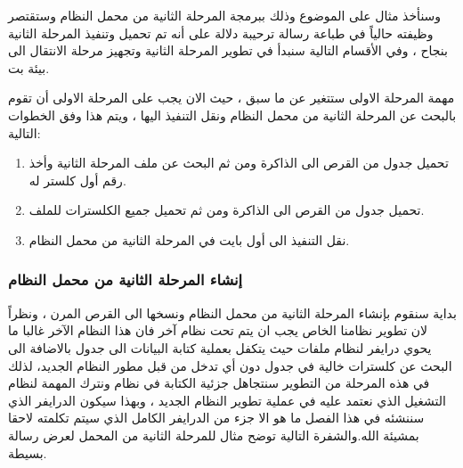 \documentclass[document.tex]{subfiles}
\begin{document}
وسنأخذ مثال على الموضوع وذلك ببرمجة المرحلة الثانية من محمل النظام  وستقتصر وظيفته حالياً في طباعة رسالة ترحيبة دلالة على أنه تم تحميل وتنفيذ المرحلة الثانية بنجاح ، وفي الأقسام التالية سنبدأ في تطوير المرحلة الثانية وتجهيز مرحلة الانتقال الى بيئة  بت.

مهمة المرحلة الاولى ستتغير عن ما سبق ، حيث الان يجب على المرحلة الاولى أن تقوم بالبحث عن المرحلة الثانية من محمل النظام ونقل التنفيذ اليها ، ويتم هذا وفق الخطوات التالية:

\begin{enumerate}
\item تحميل جدول  من القرص الى الذاكرة ومن ثم البحث عن ملف المرحلة الثانية وأخذ رقم أول كلستر له.

\item تحميل جدول  من القرص الى الذاكرة ومن ثم تحميل جميع الكلسترات للملف.

\item نقل التنفيذ الى أول بايت في المرحلة الثانية من محمل النظام.
\end{enumerate}

\subsubsection{إنشاء المرحلة الثانية من محمل النظام}

بداية سنقوم بإنشاء المرحلة الثانية من محمل النظام ونسخها الى القرص المرن ، ونظراً لان تطوير نظامنا الخاص يجب ان يتم تحت نظام آخر فان هذا النظام الآخر غالبا ما يحوي درايفر لنظام ملفات  حيث يتكفل بعملية كتابة البيانات الى جدول  بالاضافة الى البحث عن كلسترات خالية في جدول  دون أي تدخل من قبل مطور النظام الجديد، لذلك في هذه المرحلة من التطوير سنتجاهل جزئية الكتابة في نظام  ونترك المهمة لنظام التشغيل الذي نعتمد عليه في عملية تطوير النظام الجديد ، وبهذا سيكون الدرايفر الذي سننشئه في هذا الفصل ما هو الا جزء من الدرايفر الكامل الذي سيتم تكلمته لاحقا بمشيئة الله.والشفرة التالية توضح مثال للمرحلة الثانية من المحمل لعرض رسالة بسيطة.

\begin{english}
\lstset{numberstyle=\tiny,numbers=left,stepnumber=1,numbersep=5pt,tabsize=2,extendedchars=true,breaklines=true,frame=b,showspaces=false, showtabs=false,xleftmargin=10pt,framexleftmargin=10pt,framexrightmargin=5pt,framexbottommargin=4pt,showstringspaces=false,language=[x86masm]Assembler}


\end{english}
\end{document}

